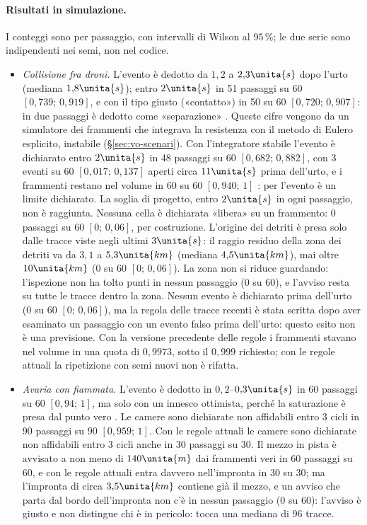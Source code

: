 \paragraph{Risultati in simulazione.} I conteggi sono per passaggio, con intervalli di Wilson al $95\,\%$; le due serie sono indipendenti nei semi, non nel codice.
\begin{itemize}
\item \emph{Collisione fra droni.} L'evento è dedotto da $1{,}2$ a $2{,}3\unita{s}$ dopo l'urto (mediana $1{,}8\unita{s}$); entro $2\unita{s}$ in 51 passaggi su 60 $[0{,}739;\,0{,}919]$, e con il tipo giusto («contatto») in 50 su 60 $[0{,}720;\,0{,}907]$: in due passaggi è dedotto come «separazione» . Queste cifre vengono da un simulatore dei frammenti che integrava la resistenza con il metodo di Eulero esplicito, instabile (\S\ref{sec:vo-scenari}). Con l'integratore stabile l'evento è dichiarato entro $2\unita{s}$ in 48 passaggi su 60 $[0{,}682;\,0{,}882]$, con 3 eventi su 60 $[0{,}017;\,0{,}137]$ aperti circa $11\unita{s}$ prima dell'urto, e i frammenti restano nel volume in 60 su 60 $[0{,}940;\,1]$ : per l'evento è un limite dichiarato. La soglia di progetto, entro $2\unita{s}$ in ogni passaggio, non è raggiunta. Nessuna cella è dichiarata «libera» su un frammento: 0 passaggi su 60 $[0;\,0{,}06]$, per costruzione. L'origine dei detriti è presa solo dalle tracce viste negli ultimi $3\unita{s}$: il raggio residuo della zona dei detriti va da $3{,}1$ a $5{,}3\unita{km}$ (mediana $4{,}5\unita{km}$), mai oltre $10\unita{km}$ (0 su 60 $[0;\,0{,}06]$). La zona non si riduce guardando: l'ispezione non ha tolto punti in nessun passaggio (0 su 60), e l'avviso resta su tutte le tracce dentro la zona. Nessun evento è dichiarato prima dell'urto (0 su 60 $[0;\,0{,}06]$), ma la regola delle tracce recenti è stata scritta dopo aver esaminato un passaggio con un evento falso prima dell'urto: questo esito non è una previsione. Con la versione precedente delle regole i frammenti stavano nel volume in una quota di $0{,}9973$, sotto il $0{,}999$ richiesto; con le regole attuali la ripetizione con semi nuovi non è rifatta.
\item \emph{Avaria con fiammata.} L'evento è dedotto in $0{,}2$--$0{,}3\unita{s}$ in 60 passaggi su 60 $[0{,}94;\,1]$, ma solo con un innesco ottimista, perché la saturazione è presa dal punto vero . Le camere sono dichiarate non affidabili entro 3 cicli in 90 passaggi su 90 $[0{,}959;\,1]$. Con le regole attuali le camere sono dichiarate non affidabili entro 3 cicli anche in 30 passaggi su 30. Il mezzo in pista è avvisato a non meno di $140\unita{m}$ dai frammenti veri in 60 passaggi su 60, e con le regole attuali entra davvero nell'impronta in 30 su 30; ma l'impronta di circa $3{,}5\unita{km}$ contiene già il mezzo, e un avviso che parta dal bordo dell'impronta non c'è in nessun passaggio (0 su 60): l'avviso è giusto e non distingue chi è in pericolo: tocca una mediana di 96 tracce.

\end{itemize}
